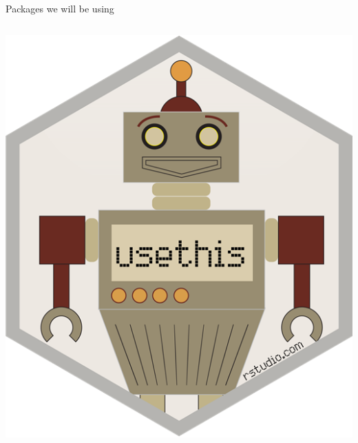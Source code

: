 \documentclass[11pt,a4paper]{beamer}
\begin{document}
\begin{frame}{Packages we will be using}
\begin{columns}
\begin{column}{0.20\textwidth}  
\begin{center}
\includegraphics[width=1\textwidth]{usethis} 

\end{center}
\end{column}


\end{columns}
\end{frame}
\end{document}
